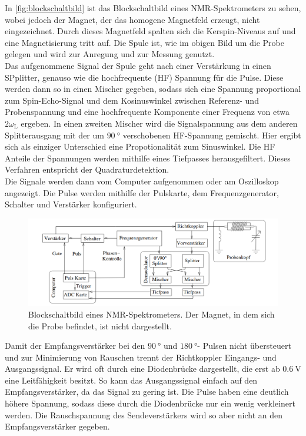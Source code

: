         \noindent In \autoref{fig:blockschaltbild} ist das Blockschaltbild eines NMR-Spektrometers zu sehen, wobei jedoch der Magnet, der das homogene Magnetfeld erzeugt, nicht eingezeichnet. Durch dieses Magnetfeld 
        spalten sich die Kerspin-Niveaus auf und eine Magnetisierung tritt auf. Die Spule ist, wie im obigen Bild um die Probe gelegen und wird zur Anregung und zur Messung genutzt. \\
        Das aufgenommene Signal der Spule geht nach einer Verstärkung in einen SPplitter, genauso wie die hochfrequente (HF) Spannung für die Pulse. Diese werden dann so in einen Mischer gegeben, sodass sich 
        eine Spannung proportional zum Spin-Echo-Signal und dem Kosinuswinkel zwischen Referenz- und Probenspannung und eine hochfrequente Komponente einer Frequenz von etwa $2\omega_\text{L}$ ergeben. 
        In einen zweiten Mischer wird die Signalspannung aus dem anderen Splitterausgang mit der um $\SI{90}{\degree}$ verschobenen HF-Spannung gemischt. Hier ergibt sich als einziger Unterschied eine 
        Propotionalität zum Sinuswinkel. Die HF Anteile der Spannungen werden mithilfe eines Tiefpasses herausgefiltert. Dieses Verfahren entspricht der Quadraturdetektion. \\ Die Signale werden dann vom Computer aufgenommen oder am Oszilloskop angezeigt. 
        Die Pulse werden mithilfe der Pulskarte, dem Frequenzgenerator, Schalter und Verstärker konfiguriert.

        \begin{figure}[H]
            \centering
            \includegraphics{images/blockschaltbild_nmr.png}
            \caption{Blockschaltbild eines NMR-Spektrometers. Der Magnet, in dem sich die Probe befindet, ist nicht dargestellt. \cite{grundlagen}}
            \label{fig:blockschaltbild}
        \end{figure}

        \noindent Damit der Empfangsverstärker bei den $\SI{90}{\degree}$ und $\SI{180}{\degree}$- Pulsen nicht übersteuert und zur Minimierung von Rauschen trennt der Richtkoppler Eingangs- und Ausgangssignal. 
        Er wird oft durch eine Diodenbrücke dargestellt, die erst ab $\SI{0.6}{\volt}$ eine Leitfähigkeit besitzt. So kann das Ausgangssignal einfach auf den Empfangsverstärker, da das Signal zu gering ist. 
        Die Pulse haben eine deutlich höhere Spannung, sodass diese durch die Diodenbrücke nur ein wenig verkleinert werden. Die Rauschspannung des Sendeverstärkers wird so aber nicht an den Empfangsverstärker 
        gegeben. 

